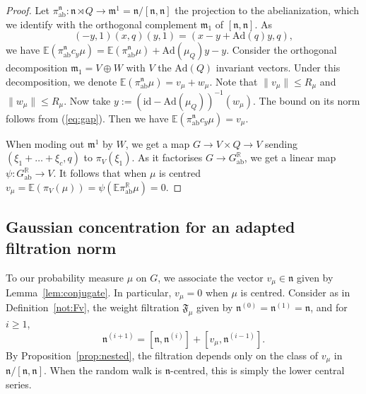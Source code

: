\documentclass[11pt,leqno]{article}
\theoremstyle{plain}
\theoremstyle{definition}
\theoremstyle{remark}
\numberwithin{equation}{section}
\newcommand{\R}{\mathbb{R}}
\newcommand{\Ad}{\mathrm{Ad}}
\begin{document}
\begin{proof} Let $\pi_{\mathrm{ab}}^{\mathfrak{n}} : \mathfrak{n} \rtimes Q \to \mathfrak{m}^1= \mathfrak{n}/[\mathfrak{n},\mathfrak{n}]$ the projection to the abelianization, which we identify with the orthogonal complement $\mathfrak{m}_1$ of $[\mathfrak{n},\mathfrak{n}]$.
As 
\[
(-y,1)(x,q)(y,1)=(x-y+\Ad(q)y,q),
\]
we have $\mathbb{E}(\pi_{\mathrm{ab}}^{\mathfrak{n}}c_y\mu)=\mathbb{E}(\pi_{\mathrm{ab}}^{\mathfrak{n}}\mu)+\Ad(\mu_Q)y-y$.  Consider the orthogonal decomposition $\mathfrak{m}_1=V\oplus W$ with $V$ the $\Ad(Q)$ invariant vectors. Under this decomposition, we denote $\mathbb{E}(\pi_{\mathrm{ab}}^{\mathfrak{n}}\mu)= v_\mu+w_\mu$. Note that $\|v_\mu\| \le R_\mu$ and $\|w_\mu\|\le R_\mu$. Now take $y:=(\mathrm{id}-\Ad(\mu_Q))^{-1}(w_\mu)$. The bound on its norm follows from (\ref{eq:gap}). Then we have $\mathbb{E}(\pi_{\mathrm{ab}}^{\mathfrak{n}}c_y\mu)=v_\mu$. 

When moding out $\mathfrak{m}^1$ by $W$, we get a map $G\to V\times Q\to V$  sending $(\xi_1+\dots+\xi_c,q)$ to $\pi_V(\xi_1)$. As it factorises $G\to G_{\mathrm{ab}}^\R$, we get a linear map $\psi:G_{\mathrm{ab}}^{\mathbb{R}}\to V$. It follows that when $\mu$ is centred $v_\mu=\mathbb{E}(\pi_V(\mu))=\psi(\mathbb{E}\pi_{\mathrm{ab}}^{\mathbb{R}}\mu)=0$. 
\end{proof}


\subsection{Gaussian concentration for an adapted filtration norm}

To our probability measure $\mu$ on $G$, we associate the vector $v_\mu \in \mathfrak{n}$ given by Lemma~\ref{lem:conjugate}. In particular, $v_\mu=0$ when $\mu$ is centred.
Consider as in Definition~\ref{not:Fv}, the weight filtration $\mathfrak{F}_\mu$ given by $\mathfrak{n}^{(0)}=\mathfrak{n}^{(1)}=\mathfrak{n}$,
and for $i\ge1$,
\[
\mathfrak{n}^{(i+1)}=\left[\mathfrak{n},\mathfrak{n}^{(i)}\right]+\left[v_{\mu},\mathfrak{n}^{(i-1)}\right].
\]
By Proposition~\ref{prop:nested}, the filtration depends only on the class of $v_{\mu}$ in $\mathfrak{n}/[\mathfrak{n},\mathfrak{n}]$. When the random walk is $\mathfrak{n}$-centred, this is simply the lower central series.
\end{document}
